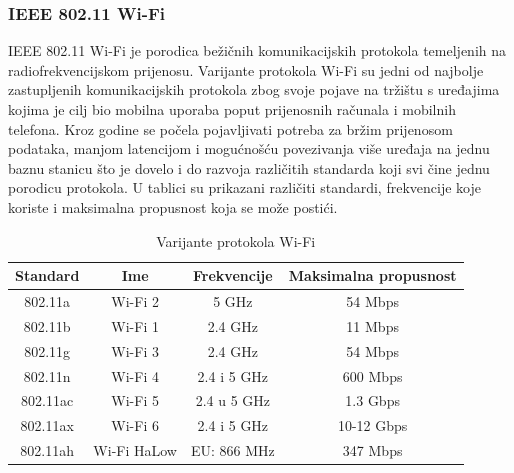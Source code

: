 \documentclass[times, utf8, diplomski]{fer}
\begin{document}
\subsubsection{IEEE 802.11 Wi-Fi}
IEEE 802.11 Wi-Fi\citep{Wifialiance} je porodica bežičnih komunikacijskih protokola temeljenih na radiofrekvencijskom prijenosu. Varijante protokola Wi-Fi su jedni od najbolje zastupljenih komunikacijskih protokola zbog svoje pojave na tržištu s uređajima kojima je cilj bio mobilna uporaba poput prijenosnih računala i mobilnih telefona. Kroz godine se počela pojavljivati potreba za bržim prijenosom podataka, manjom latencijom i mogućnošću povezivanja više uređaja na jednu baznu stanicu  što je dovelo i do razvoja različitih standarda koji svi čine jednu porodicu protokola. U tablici su prikazani različiti standardi, frekvencije koje koriste i maksimalna propusnost koja se može postići.
\begin{table}[H]
    \centering
    \caption{Varijante protokola Wi-Fi}
    \begin{tabular}{| c | c | c | c |} 
    \hline
    \textbf{Standard} & \textbf{Ime} & \textbf{Frekvencije} & \textbf{Maksimalna propusnost}\\
    \hline\hline
    802.11a & Wi-Fi 2 & 5 GHz & 54 Mbps\\
    \hline
    802.11b & Wi-Fi 1 & 2.4 GHz & 11 Mbps\\ 
    \hline
    802.11g & Wi-Fi 3 & 2.4 GHz & 54 Mbps\\ 
    \hline
    802.11n & Wi-Fi 4 & 2.4 i 5 GHz & 600 Mbps\\ 
    \hline
    802.11ac & Wi-Fi 5 & 2.4 u 5 GHz & 1.3 Gbps \\ 
    \hline
    802.11ax & Wi-Fi 6 & 2.4 i 5 GHz & 10-12 Gbps\\ 
    \hline
    802.11ah & Wi-Fi HaLow & EU: 866 MHz & 347 Mbps\\ 
    \hline
    \end{tabular}
    \label{tab:wifi}
\end{table}
\end{document}
